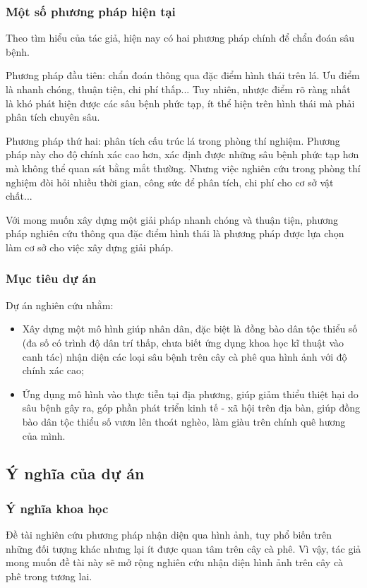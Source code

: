 \documentclass[a4paper,14pt]{extarticle}
\begin{document}
		\subsubsection{Một số phương pháp hiện tại}
		Theo tìm hiểu của tác giả, hiện nay có hai phương pháp chính để chẩn đoán sâu bệnh.
		
		Phương pháp đầu tiên: chẩn đoán thông qua đặc điểm hình thái trên lá. Ưu điểm là nhanh chóng, thuận tiện, chi phí thấp... Tuy nhiên, nhược điểm rõ ràng nhất là khó phát hiện được các sâu bệnh phức tạp, ít thể hiện trên hình thái mà phải phân tích chuyên sâu.
		
		Phương pháp thứ hai: phân tích cấu trúc lá trong phòng thí nghiệm. Phương pháp này cho độ chính xác cao hơn, xác định được những sâu bệnh phức tạp hơn mà không thể quan sát bằng mắt thường. Nhưng việc nghiên cứu trong phòng thí nghiệm đòi hỏi nhiều thời gian, công sức để phân tích, chi phí cho cơ sở vật chất...
		
		Với mong muốn xây dựng một giải pháp nhanh chóng và thuận tiện, phương pháp nghiên cứu thông qua đặc điểm hình thái là phương pháp được lựa chọn làm cơ sở cho việc xây dựng giải pháp.

		\subsubsection{Mục tiêu dự án}
		Dự án nghiên cứu nhằm:
		\begin{itemize}
			\item Xây dựng một mô hình giúp nhân dân, đặc biệt là đồng bào dân tộc thiểu số (đa số có trình độ dân trí thấp, chưa biết ứng dụng khoa học kĩ thuật vào canh tác) nhận diện các loại sâu bệnh trên cây cà phê qua hình ảnh với độ chính xác cao;
			\item Ứng dụng mô hình vào thực tiễn tại địa phương, giúp giảm thiểu thiệt hại do sâu bệnh gây ra, góp phần phát triển kinh tế - xã hội trên địa bàn, giúp đồng bào dân tộc thiểu số vươn lên thoát nghèo, làm giàu trên chính quê hương của mình.
		\end{itemize}
			
	\subsection{Ý nghĩa của dự án}
		\subsubsection{Ý nghĩa khoa học}
		Đề tài nghiên cứu phương pháp nhận diện qua hình ảnh, tuy phổ biến trên những đối tượng khác nhưng lại ít được quan tâm trên cây cà phê. Vì vậy, tác giả mong muốn đề tài này sẽ mở rộng nghiên cứu nhận diện hình ảnh trên cây cà phê trong tương lai.
\end{document}
